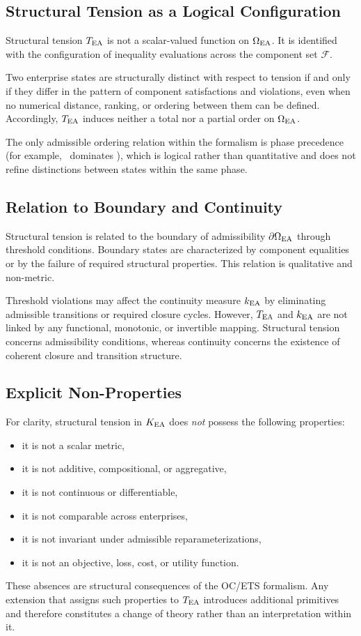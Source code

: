 \subsection{Structural Tension as a Logical Configuration}

Structural tension $T_{\mathrm{EA}}$ is not a scalar-valued function on $\Omega_{\mathrm{EA}}$.
It is identified with the configuration of inequality evaluations across
the component set $\mathcal{F}$.

Two enterprise states are structurally distinct with respect to tension
if and only if they differ in the pattern of component satisfactions and
violations, even when no numerical distance, ranking, or ordering between
them can be defined. Accordingly, $T_{\mathrm{EA}}$ induces neither a total nor a
partial order on $\Omega_{\mathrm{EA}}$.

The only admissible ordering relation within the formalism is phase
precedence (for example, \PHASESTOP\ dominates \PHASECOLLAPSE), which is
logical rather than quantitative and does not refine distinctions between
states within the same phase.

\subsection{Relation to Boundary and Continuity}

Structural tension is related to the boundary of admissibility
$\partial\Omega_{\mathrm{EA}}$ through threshold conditions. Boundary states are
characterized by component equalities or by the failure of required
structural properties. This relation is qualitative and non-metric.

Threshold violations may affect the continuity measure $k_{\mathrm{EA}}$ by
eliminating admissible transitions or required closure cycles. However,
$T_{\mathrm{EA}}$ and $k_{\mathrm{EA}}$ are not linked by any functional, monotonic, or
invertible mapping. Structural tension concerns admissibility conditions,
whereas continuity concerns the existence of coherent closure and
transition structure.

\subsection{Explicit Non-Properties}

For clarity, structural tension in $K_{\mathrm{EA}}$ does \emph{not} possess the
following properties:

\begin{itemize}
  \item it is not a scalar metric,
  \item it is not additive, compositional, or aggregative,
  \item it is not continuous or differentiable,
  \item it is not comparable across enterprises,
  \item it is not invariant under admissible reparameterizations,
  \item it is not an objective, loss, cost, or utility function.
\end{itemize}

These absences are structural consequences of the OC/ETS formalism. Any
extension that assigns such properties to $T_{\mathrm{EA}}$ introduces additional
primitives and therefore constitutes a change of theory rather than an
interpretation within it.

